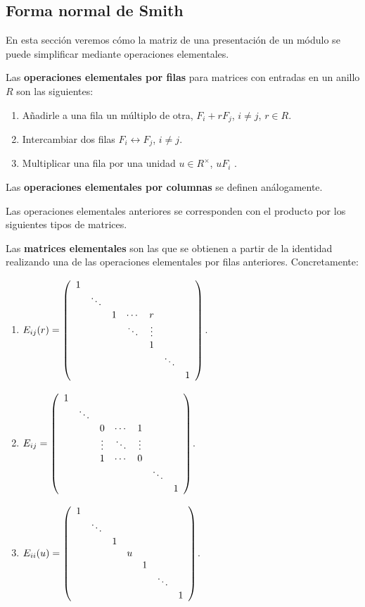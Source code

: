 \hypertarget{forma-normal-de-smith}{%
\subsection{Forma normal de Smith}\label{forma-normal-de-smith}}

En esta sección veremos cómo la matriz de una presentación de un módulo
se puede simplificar mediante operaciones elementales.


Las \textbf{operaciones elementales por filas} para matrices con
entradas en un anillo \(R\) son las siguientes:

\begin{enumerate}
\def\labelenumi{\arabic{enumi}.}
\item
  Añadirle a una fila un múltiplo de otra, \(F_i+rF_j\), \(i\neq j\),
  \(r\in R\).
\item
  Intercambiar dos filas \(F_i\leftrightarrow F_j\), \(i\neq j\).
\item
  Multiplicar una fila por una unidad \(u\in R^\times\), \(uF_i\) .
\end{enumerate}

Las \textbf{operaciones elementales por columnas} se definen
análogamente.


Las operaciones elementales anteriores se corresponden con el producto
por los siguientes tipos de matrices.


Las \textbf{matrices elementales} son las que se obtienen a partir de la
identidad realizando una de las operaciones elementales por filas
anteriores. Concretamente:

\begin{enumerate}
\def\labelenumi{\arabic{enumi}.}
\item
  \(E_{ij}( r )=\left(\begin{array}{ccccccc}1&&&&&&\cr &\ddots&&&&&\cr &&1&\cdots&r&&\cr &&&\ddots&\vdots&&\cr &&&&1&&\cr &&&&&\ddots&\cr &&&&&&1\end{array}\right)\).
\item
  \(E_{ij}=\left(\begin{array}{ccccccc}1&&&&&&\cr &\ddots&&&&&\cr &&0&\cdots&1&&\cr &&\vdots&\ddots&\vdots&&\cr &&1&\cdots&0&&\cr &&&&&\ddots&\cr &&&&&&1\end{array}\right)\).
\item
  \(E_{ii}(u)=\left(\begin{array}{ccccccc}1&&&&&&\cr &\ddots&&&&&\cr &&1&&&&\cr &&&u&&&\cr &&&&1&&\cr &&&&&\ddots&\cr &&&&&&1\end{array}\right)\).
\end{enumerate}

